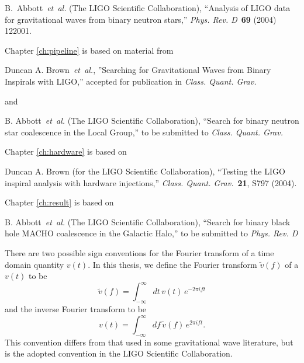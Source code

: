 \documentclass[12pt,notitlepage]{report}
\newcommand{\cqg}{{\it Class. Quant. Grav.}}
\newcommand{\prd}{{\it Phys. Rev. D}}
\begin{document}
\vspace*{0.25cm}

\noindent B.~Abbott~{\it et~al.} (The LIGO Scientific Collaboration),
``Analysis of LIGO data for gravitational waves from binary neutron stars,''
\prd~{\bf 69} (2004) 122001.

\vspace*{0.5cm}

\noindent Chapter \ref{ch:pipeline} is based on material from

\vspace*{0.25cm}

\noindent Duncan A. Brown~{\it et~al.}, ''Searching for Gravitational Waves
from Binary Inspirals with LIGO,'' accepted for publication in \cqg

\vspace*{0.25cm}

\noindent and

\vspace*{0.25cm}

\noindent B. Abbott~{\it et~al.} (The LIGO Scientific Collaboration), ``Search
for binary neutron star coalescence in the Local Group,'' to be submitted to
\cqg

\vspace*{0.5cm}

\noindent Chapter \ref{ch:hardware} is based on 

\vspace*{0.25cm}

\noindent Duncan A. Brown (for the LIGO Scientific Collaboration), ``Testing
the LIGO inspiral analysis with hardware injections,'' \cqg~{\bf 21}, S797
(2004).

\vspace*{0.5cm}

\noindent Chapter \ref{ch:result} is based on

\vspace*{0.25cm}

\noindent B. Abbott~{\it et~al.} (The LIGO Scientific Collaboration), ``Search
for binary black hole MACHO coalescence in the Galactic Halo,'' to be
submitted to \prd


%

There are two possible sign conventions for the Fourier transform of a time
domain quantity $v(t)$. In this thesis, we define the Fourier transform
$\tilde{v}(f)$ of a $v(t)$ to be
\begin{equation}
\label{eq:ft}
\tilde{v}(f)=\int_{-\infty}^\infty dt\,v(t)\, e^{- 2 \pi i f t}
\end{equation}
and the inverse Fourier transform to be 
\begin{equation}
\label{eq:ift}
v(t)=\int_{-\infty}^\infty df\,\tilde{v}(f)\, e^{2 \pi i f t}.
\end{equation}
This convention differs from that used in some gravitational wave literature,
but is the adopted convention in the LIGO Scientific Collaboration.
\end{document}
